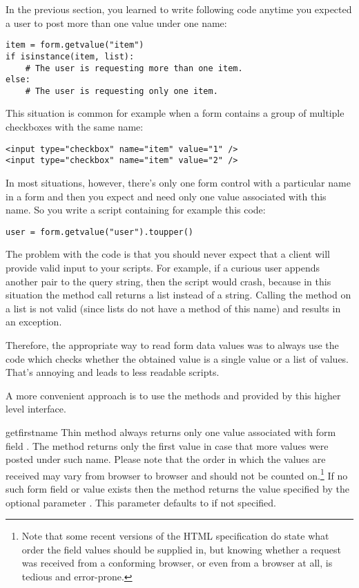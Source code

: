 In the previous section, you learned to write following code anytime
you expected a user to post more than one value under one name:

\begin{verbatim}
item = form.getvalue("item")
if isinstance(item, list):
    # The user is requesting more than one item.
else:
    # The user is requesting only one item.
\end{verbatim}

This situation is common for example when a form contains a group of
multiple checkboxes with the same name:

\begin{verbatim}
<input type="checkbox" name="item" value="1" />
<input type="checkbox" name="item" value="2" />
\end{verbatim}

In most situations, however, there's only one form control with a
particular name in a form and then you expect and need only one value
associated with this name.  So you write a script containing for
example this code:

\begin{verbatim}
user = form.getvalue("user").toupper()
\end{verbatim}

The problem with the code is that you should never expect that a
client will provide valid input to your scripts.  For example, if a
curious user appends another  pair to the query string,
then the script would crash, because in this situation the
 method call returns a list instead of a
string.  Calling the  method on a list is not valid
(since lists do not have a method of this name) and results in an
 exception.

Therefore, the appropriate way to read form data values was to always
use the code which checks whether the obtained value is a single value
or a list of values.  That's annoying and leads to less readable
scripts.

A more convenient approach is to use the methods 
and  provided by this higher level interface.

\begin{methoddesc}[FieldStorage]{getfirst}{name}
  Thin method always returns only one value associated with form field
  .  The method returns only the first value in case that
  more values were posted under such name.  Please note that the order
  in which the values are received may vary from browser to browser
  and should not be counted on.\footnote{Note that some recent
      versions of the HTML specification do state what order the
      field values should be supplied in, but knowing whether a
      request was received from a conforming browser, or even from a
      browser at all, is tedious and error-prone.}  If no such form
  field or value exists then the method returns the value specified by
  the optional parameter .  This parameter defaults to
   if not specified.
\end{methoddesc}

